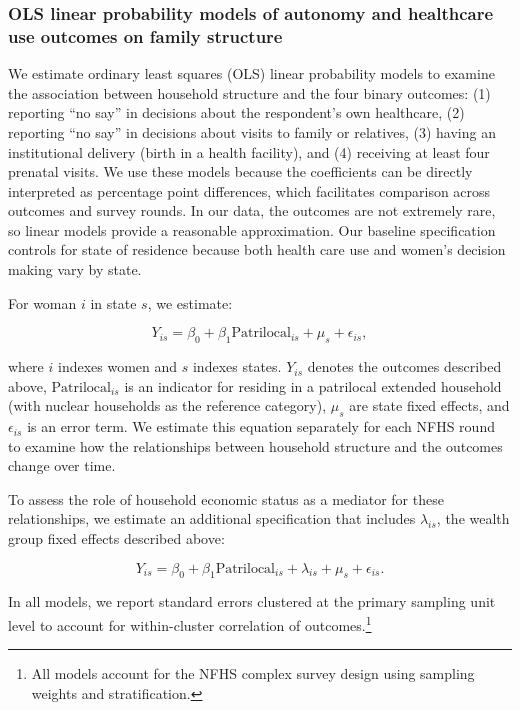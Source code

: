 \documentclass[10pt,twoside,reqno]{article}
\begin{document}
\subsubsection{OLS linear probability models of autonomy and healthcare use outcomes on family structure}

We estimate ordinary least squares (OLS) linear probability models to examine the association between household structure and the four binary outcomes: (1) reporting ``no say'' in decisions about the respondent's own healthcare, (2) reporting ``no say'' in decisions about visits to family or relatives, (3) having an institutional delivery (birth in a health facility), and (4) receiving at least four prenatal visits. We use these models because the coefficients can be directly interpreted as percentage point differences, which facilitates comparison across outcomes and survey rounds. In our data, the outcomes are not extremely rare, so linear models provide a reasonable approximation.  Our baseline specification controls for state of residence because both health care use and women's decision making vary by state.  

For woman $i$ in state $s$, we estimate:

\begin{equation} \label{eq:nocontrols}
Y_{is} = \beta_0 + \beta_1 \text{Patrilocal}_{is} + \mu_s + \epsilon_{is},
\end{equation}

where $i$ indexes women and $s$ indexes states. $Y_{is}$ denotes the outcomes described above, $\text{Patrilocal}_{is}$ is an indicator for residing in a patrilocal extended household (with nuclear households as the reference category), $\mu_s$ are state fixed effects, and $\epsilon_{is}$ is an error term. We estimate this equation separately for each NFHS round to examine how the relationships between household structure and the outcomes change over time.

To assess the role of household economic status as a mediator for these relationships, we estimate an additional specification that includes $\lambda_{is}$, the wealth group fixed effects described above:

\begin{equation} \label{eq:controls}
Y_{is} = \beta_0 + \beta_1 \text{Patrilocal}_{is} + \lambda_{is} + \mu_s + \epsilon_{is}.
\end{equation}

In all models, we report standard errors clustered at the primary sampling unit level to account for within-cluster correlation of outcomes.\footnote{All models account for the NFHS complex survey design using sampling weights and stratification.}
\end{document}
